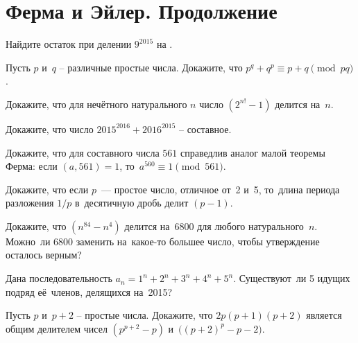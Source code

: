 
\section*{Ферма и Эйлер. Продолжение}



\begin{problems}

\item
Найдите остаток при делении $9^{2015}$ на
\quad
{}
\quad
{}.

\item
Пусть $p$ и~$q$ -- различные простые числа.
Докажите, что
\(
    p^q + q^p
\equiv
    p + q
\pmod{p q}
\).


\item
Докажите, что для нечётного натурального $n$ число $(2^{n!} - 1)$ делится
на~$n$.

\item
Докажите, что число $2015^{2016} + 2016^{2015}$ -- составное.

\item
Докажите, что для составного числа $561$ справедлив аналог малой теоремы Ферма:
если $(a, 561) = 1$, то~$a^{560} \equiv 1 \pmod{561}$.

\item
Докажите, что если $p$~--- простое число, отличное от~2 и~5, то~длина периода
разложения $1 / p$ в~десятичную дробь делит $(p - 1)$.

\item
\subproblem
Докажите, что $(n^{84} - n^4)$ делится на~6800 для любого натурального~$n$.
\\
\subproblem
Можно~ли 6800 заменить на~какое-то большее число, чтобы утверждение осталось
верным?

\item
Дана последовательность $a_n = 1^n + 2^n + 3^n + 4^n + 5^n$.
Существуют~ли 5 идущих подряд её~членов, делящихся на~2015?

\item
Пусть $p$ и~$p + 2$ -- простые числа.
Докажите, что $2 p (p + 1) (p + 2)$ является общим делителем чисел
$(p^{p+2} - p)$ и~$\bigl( (p + 2)^p - p - 2 \bigr)$.


\end{problems}
